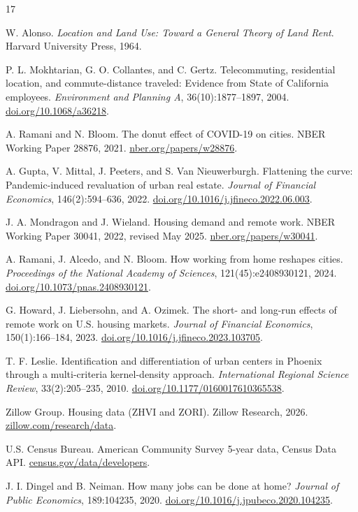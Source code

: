 \documentclass[11pt]{article}
\newcommand{\uMokh}{https://doi.org/10.1068/a36218}
\newcommand{\uRamani}{https://www.nber.org/papers/w28876}
\newcommand{\uGupta}{https://doi.org/10.1016/j.jfineco.2022.06.003}
\newcommand{\uMond}{https://www.nber.org/papers/w30041}
\newcommand{\uPnas}{https://doi.org/10.1073/pnas.2408930121}
\newcommand{\uHoward}{https://doi.org/10.1016/j.jfineco.2023.103705}
\newcommand{\uLeslie}{https://doi.org/10.1177/0160017610365538}
\newcommand{\uZillow}{https://www.zillow.com/research/data/}
\newcommand{\uAcs}{https://www.census.gov/data/developers/data-sets/acs-5year.html}
\newcommand{\uDingel}{https://doi.org/10.1016/j.jpubeco.2020.104235}
\begin{document}
\begin{thebibliography}{17}\setlength{\itemsep}{0pt}

 W. Alonso. \textit{Location and Land Use: Toward a General
Theory of Land Rent}. Harvard University Press, 1964.

 P. L. Mokhtarian, G. O. Collantes, and C. Gertz.
Telecommuting, residential location, and commute-distance traveled: Evidence from
State of California employees. \textit{Environment and Planning A},
36(10):1877--1897, 2004. \href{\uMokh}{doi.org/10.1068/a36218}.

 A. Ramani and N. Bloom. The donut effect of COVID-19 on cities.
NBER Working Paper 28876, 2021. \href{\uRamani}{nber.org/papers/w28876}.

 A. Gupta, V. Mittal, J. Peeters, and S. Van Nieuwerburgh.
Flattening the curve: Pandemic-induced revaluation of urban real estate.
\textit{Journal of Financial Economics}, 146(2):594--636, 2022.
\href{\uGupta}{doi.org/10.1016/j.jfineco.2022.06.003}.

 J. A. Mondragon and J. Wieland. Housing demand and remote
work. NBER Working Paper 30041, 2022, revised May 2025.
\href{\uMond}{nber.org/papers/w30041}.

 A. Ramani, J. Alcedo, and N. Bloom. How working from home reshapes
cities. \textit{Proceedings of the National Academy of Sciences},
121(45):e2408930121, 2024. \href{\uPnas}{doi.org/10.1073/pnas.2408930121}.

 G. Howard, J. Liebersohn, and A. Ozimek. The short- and long-run
effects of remote work on U.S. housing markets. \textit{Journal of Financial
Economics}, 150(1):166--184, 2023.
\href{\uHoward}{doi.org/10.1016/j.jfineco.2023.103705}.

 T. F. Leslie. Identification and differentiation of urban
centers in Phoenix through a multi-criteria kernel-density approach.
\textit{International Regional Science Review}, 33(2):205--235, 2010.
\href{\uLeslie}{doi.org/10.1177/0160017610365538}.

 Zillow Group. Housing data (ZHVI and ZORI). Zillow Research,
2026. \href{\uZillow}{zillow.com/research/data}.

 U.S. Census Bureau. American Community Survey 5-year data, Census
Data API. \href{\uAcs}{census.gov/data/developers}.

 J. I. Dingel and B. Neiman. How many jobs can be done at home?
\textit{Journal of Public Economics}, 189:104235, 2020.
\href{\uDingel}{doi.org/10.1016/j.jpubeco.2020.104235}.


\end{thebibliography}
\end{document}
